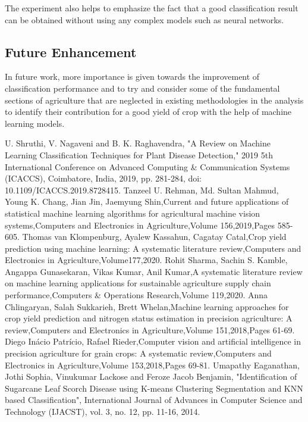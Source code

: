 \documentclass[12pt]{article}
\begin{document}
The experiment also helps to emphasize the fact that a good classification result can be obtained without using any complex models such as neural networks. 
  
	\subsection{Future Enhancement}
	In future work, more importance is given towards the improvement of classification performance and to try and consider some of the fundamental sections of agriculture that are neglected in existing methodologies in the analysis to identify their contribution for a good yield of crop with the help of machine learning models.
\clearpage	
	
	\begin{thebibliography}{9}
	U. Shruthi, V. Nagaveni and B. K. Raghavendra, "A Review on Machine Learning Classification Techniques for Plant Disease Detection," 2019 5th International Conference on Advanced Computing \& Communication Systems (ICACCS), Coimbatore, India, 2019, pp. 281-284, doi: 10.1109/ICACCS.2019.8728415.
	Tanzeel U. Rehman, Md. Sultan Mahmud, Young K. Chang, Jian Jin, Jaemyung Shin,Current and future applications of statistical machine learning algorithms for agricultural machine vision systems,Computers and Electronics in Agriculture,Volume 156,2019,Pages 585-605.
	Thomas van Klompenburg, Ayalew Kassahun, Cagatay Catal,Crop yield prediction using machine learning: A systematic literature review,Computers and Electronics in Agriculture,Volume177,2020.
	Rohit Sharma, Sachin S. Kamble, Angappa Gunasekaran, Vikas Kumar, Anil Kumar,A systematic literature review on machine learning applications for sustainable agriculture supply chain performance,Computers \& Operations Research,Volume 119,2020.
	Anna Chlingaryan, Salah Sukkarieh, Brett Whelan,Machine learning approaches for crop yield prediction and nitrogen status estimation in precision agriculture: A review,Computers and Electronics in Agriculture,Volume 151,2018,Pages 61-69.
	Diego Inácio Patrício, Rafael Rieder,Computer vision and artificial intelligence in precision agriculture for grain crops: A systematic review,Computers and Electronics in Agriculture,Volume 153,2018,Pages 69-81.
	 Umapathy Eaganathan, Jothi Sophia, Vinukumar Lackose and Feroze Jacob Benjamin, "Identification of Sugarcane Leaf Scorch Disease using K-means Clustering Segmentation and KNN based Classification", International Journal of Advances in Computer Science and Technology (IJACST), vol. 3, no. 12, pp. 11-16, 2014.

\end{thebibliography}
\end{document}

